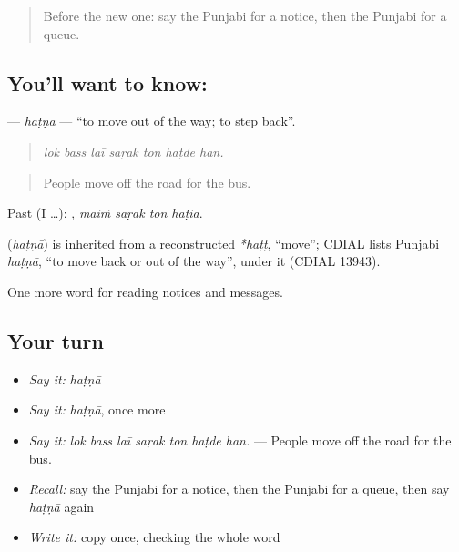 \label{lesson:PA-C253-hatna}



\begin{quote}
Before the new one: say the Punjabi for a notice, then the Punjabi for a queue.
\end{quote}

\subsection*{You'll want to know: }
\textbf{} — \emph{haṭṇā} — \textquotedblleft{}to move out of the way; to step back\textquotedblright{}.

\begin{quote}
      
\end{quote}

\begin{quote}
\emph{lok bass laī saṛak ton haṭde han.}
\end{quote}

\begin{quote}
People move off the road for the bus.
\end{quote}

Past (I …):    , \emph{maiṁ saṛak ton haṭiā}.

\begin{cousinweb}
\textbf{} (\emph{haṭṇā}) is inherited from a reconstructed \emph{*haṭṭ}, \textquotedblleft{}move\textquotedblright{}; CDIAL lists Punjabi \emph{haṭṇā}, \textquotedblleft{}to move back or out of the way\textquotedblright{}, under it (CDIAL 13943).
\end{cousinweb}

\begin{grammarlens}[title={What you've built}]
One more word for reading notices and messages.
\end{grammarlens}

\subsection*{Your turn}
\begin{itemize}
\raggedright
  \item \emph{Say it:} \emph{haṭṇā}
  \item \emph{Say it:} \emph{haṭṇā}, once more
  \item \emph{Say it:} \emph{lok bass laī saṛak ton haṭde han.} — People move off the road for the bus.
  \item \emph{Recall:} say the Punjabi for a notice, then the Punjabi for a queue, then say \emph{haṭṇā} again
  \item \emph{Write it:} copy \textbf{} once, checking the whole word
\end{itemize}

